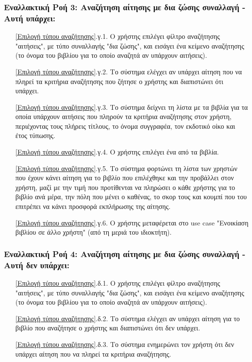 \documentclass[12pt,a4paper]{article}
\begin{document}
\subsubsection*{Εναλλακτική Ροή 3: Αναζήτηση αίτησης με δια ζώσης συναλλαγή - Αυτή υπάρχει:}
\begin{enumerate}
    \item[\ref{Επιλογή τύπου αναζήτησης}.γ.1.] Ο χρήστης επιλέγει φίλτρο αναζήτησης "αιτήσεις", με τύπο συναλλαγής "δια ζώσης", και εισάγει ένα κείμενο αναζήτησης (το όνομα του βιβλίου για το οποίο αναζητά αν υπάρχουν αιτήσεις).
    \item[\ref{Επιλογή τύπου αναζήτησης}.γ.2.] Το σύστημα ελέγχει αν υπάρχει αίτηση που να πληρεί τα κριτήρια αναζήτησης που ζήτησε ο χρήστης και διαπιστώνει ότι υπάρχει.
    \item[\ref{Επιλογή τύπου αναζήτησης}.γ.3.] Το σύστημα δείχνει τη λίστα με τα βιβλία για τα οποία υπάρχουν αιτήσεις που πληρούν τα κριτήρια αναζήτησης στον χρήστη, περιέχοντας τους πλήρεις τίτλους, το όνομα συγγραφέα, τον εκδοτικό οίκο και έτος τύπωσης.
    \item[\ref{Επιλογή τύπου αναζήτησης}.γ.4.] Ο χρήστης επιλέγει ένα από τα βιβλία.
    \item[\ref{Επιλογή τύπου αναζήτησης}.γ.5.] Το σύστημα φορτώνει τη λίστα των χρηστών που έχουν κάνει αίτηση για το βιβλίο που επιλέχθηκε και την προβάλλει στον χρήστη, μαζί με την τιμή που προτίθενται να πληρώσει ο κάθε χρήστης για το βιβλίο ανά μέρα, την πόλη που μένει ο καθένας, το σκορ τους και κουμπί που του επιτρέπει να κάνει προσφορά εκπλήρωσης της αίτησης.
    \item[\ref{Επιλογή τύπου αναζήτησης}.γ.6.] Ο χρήστης μεταφέρεται στο use case "Ενοικίαση βιβλίου σε άλλο χρήστη" (από τη μεριά του ιδιοκτήτη).
\end{enumerate}

\subsubsection*{Εναλλακτική Ροή 4: Αναζήτηση αίτησης με δια ζώσης συναλλαγή - Αυτή δεν υπάρχει:}
\begin{enumerate}
    \item[\ref{Επιλογή τύπου αναζήτησης}.δ.1.] Ο χρήστης επιλέγει φίλτρο αναζήτησης "αιτήσεις", με τύπο συναλλαγής "δια ζώσης", και εισάγει ένα κείμενο αναζήτησης (το όνομα του βιβλίου για το οποίο αναζητά αν υπάρχουν αιτήσεις).
    \item[\ref{Επιλογή τύπου αναζήτησης}.δ.2.] Το σύστημα ελέγχει αν υπάρχει αίτηση για το βιβλίο που αναζήτησε ο χρήστης και διαπιστώνει ότι δεν υπάρχει.
    \item[\ref{Επιλογή τύπου αναζήτησης}.δ.3.] Το σύστημα ενημερώνει τον χρήστη ότι δεν υπάρχει αίτηση που να πληρεί τα κριτήρια αναζήτησης.
\end{enumerate}
\end{document}
